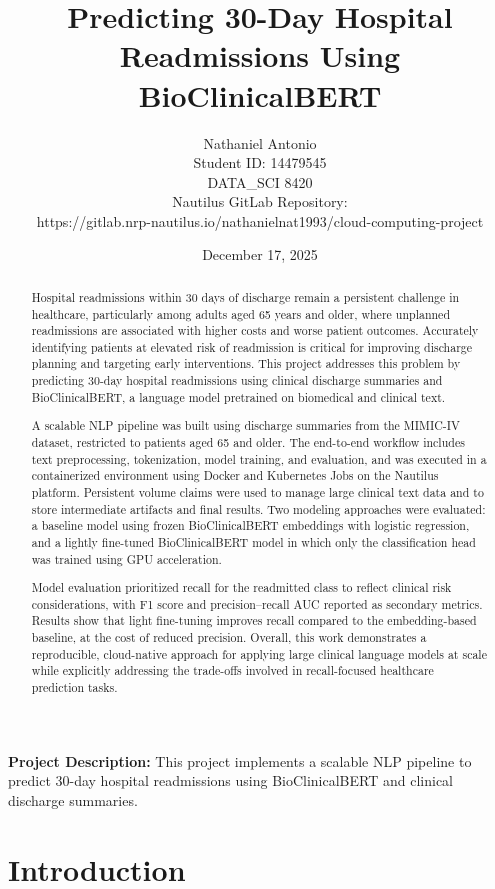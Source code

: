 \documentclass[11pt]{article}
\title{
Predicting 30-Day Hospital Readmissions Using BioClinicalBERT
}
\author{
Nathaniel Antonio \\
Student ID: 14479545 \\
DATA\_SCI 8420 \\
Nautilus GitLab Repository: \\
https://gitlab.nrp-nautilus.io/nathanielnat1993/cloud-computing-project
}
\date{December 17, 2025}
\begin{document}
\maketitle

\noindent\textbf{Project Description:} This project implements a scalable NLP pipeline to predict 30-day hospital readmissions using BioClinicalBERT and clinical discharge summaries.

\begin{abstract}
Hospital readmissions within 30 days of discharge remain a persistent challenge in healthcare, particularly among adults aged 65 years and older, where unplanned readmissions are associated with higher costs and worse patient outcomes. Accurately identifying patients at elevated risk of readmission is critical for improving discharge planning and targeting early interventions. This project addresses this problem by predicting 30-day hospital readmissions using clinical discharge summaries and BioClinicalBERT, a language model pretrained on biomedical and clinical text.

A scalable NLP pipeline was built using discharge summaries from the MIMIC-IV dataset, restricted to patients aged 65 and older. The end-to-end workflow includes text preprocessing, tokenization, model training, and evaluation, and was executed in a containerized environment using Docker and Kubernetes Jobs on the Nautilus platform. Persistent volume claims were used to manage large clinical text data and to store intermediate artifacts and final results. Two modeling approaches were evaluated: a baseline model using frozen BioClinicalBERT embeddings with logistic regression, and a lightly fine-tuned BioClinicalBERT model in which only the classification head was trained using GPU acceleration.

Model evaluation prioritized recall for the readmitted class to reflect clinical risk considerations, with F1 score and precision--recall AUC reported as secondary metrics. Results show that light fine-tuning improves recall compared to the embedding-based baseline, at the cost of reduced precision. Overall, this work demonstrates a reproducible, cloud-native approach for applying large clinical language models at scale while explicitly addressing the trade-offs involved in recall-focused healthcare prediction tasks.
\end{abstract}

\clearpage
\tableofcontents
\clearpage

\section{Introduction}
\end{document}

